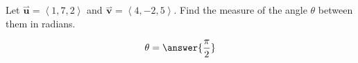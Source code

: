 \documentclass{ximera}
\author{Gregory Hartman \and Matthew Carr}
\begin{document}
\begin{exercise}
Let $\overset{\boldsymbol{\rightharpoonup}}{\mathbf{u}} = \left< 1,7,2 \right>$ and $\overset{\boldsymbol{\rightharpoonup}}{\mathbf{v}} = \left< 4,-2,5\right>$. Find the
measure of the angle $\theta$ between them in radians.
\begin{prompt}
\[
\theta=\answer{\frac{\pi}{2}}
\]
\end{prompt}

\end{exercise}
\end{document}
